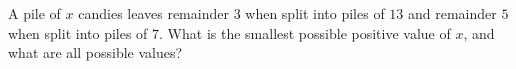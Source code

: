 A pile of $x$ candies leaves remainder $3$ when split into piles of $13$ and remainder $5$ when split into piles of $7$. What is the smallest possible positive value of $x$, and what are all possible values?
